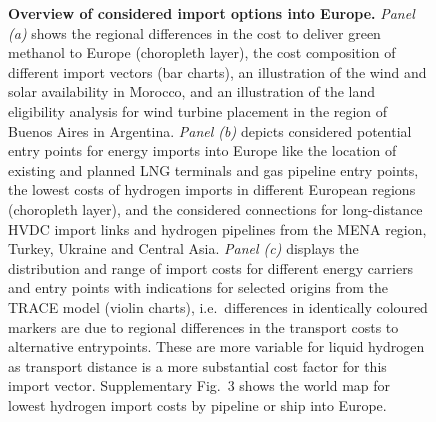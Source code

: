 \documentclass[1p,11pt]{elsarticle} %
\providecommand{\DIFaddbegin}{} %
\providecommand{\DIFaddend}{} %
\newcommand{\DIFaddincludegraphics}[2][]{{\color{blue}\fbox{\DIFOincludegraphics[#1]{#2}}}} %
\DeclareRobustCommand{\DIFaddbegin}{\DIFOaddbegin \let\includegraphics\DIFaddincludegraphics} %
\DeclareRobustCommand{\DIFaddend}{\DIFOaddend \let\includegraphics\DIFOincludegraphics} %
\begin{document}
\DIFaddbegin \begin{figure}
    \caption{\textbf{Overview of considered import options into Europe.}
        \textit{Panel (a)} shows the regional differences in the cost to deliver
        green methanol to Europe (choropleth layer), the cost composition of
        different import vectors (bar charts), an illustration of the wind and
        solar availability in Morocco, and an illustration of the land
        eligibility analysis for wind turbine placement in the region of Buenos
        Aires in Argentina. \textit{Panel (b)} depicts considered potential
        entry points for energy imports into Europe like the location of
        existing and planned LNG terminals and gas pipeline entry points, the
        lowest costs of hydrogen imports in different European regions
        (choropleth layer), and the considered connections for long-distance
        HVDC import links and hydrogen pipelines from the MENA region, Turkey,
        Ukraine and Central Asia. \textit{Panel (c)} displays the distribution
        and range of import costs for different energy carriers and entry points
        with indications for selected origins from the TRACE model
        (violin charts), i.e.~differences in identically coloured markers are
        due to regional differences in the transport costs to alternative
        entrypoints. These are more variable for liquid hydrogen as transport
        distance is a more substantial cost factor for this import vector.
        Supplementary Fig.~3 shows the world map for lowest 
        hydrogen import costs by pipeline or ship into Europe.}
    \label{fig:options}
\end{figure}
\DIFaddend 

\end{document}
